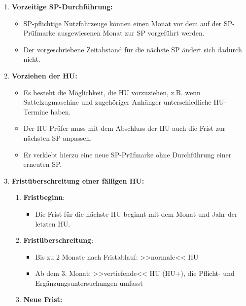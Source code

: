 \documentclass{vorlage-design-main}
\begin{document}
\begin{enumerate}
\def\labelenumi{\arabic{enumi}.}

\item
  \textbf{Vorzeitige SP-Durchführung:}

  \begin{itemize}

  \item
    SP-pflichtige Nutzfahrzeuge können einen Monat vor dem auf der
    SP-Prüfmarke ausgewiesenen Monat zur SP vorgeführt werden.
  \item
    Der vorgeschriebene Zeitabstand für die nächste SP ändert sich
    dadurch nicht.
  \end{itemize}
\item
  \textbf{Vorziehen der HU:}

  \begin{itemize}

  \item
    Es besteht die Möglichkeit, die HU vorzuziehen, z.B. wenn
    Sattelzugmaschine und zugehöriger Anhänger unterschiedliche
    HU-Termine haben.
  \item
    Der HU-Prüfer muss mit dem Abschluss der HU auch die Frist zur
    nächsten SP anpassen.
  \item
    Er verklebt hierzu eine neue SP-Prüfmarke ohne Durchführung einer
    erneuten SP.
  \end{itemize}
\item
  \textbf{Fristüberschreitung einer fälligen HU:}

  \begin{enumerate}
  \def\labelenumii{\arabic{enumii}.}

  \item
    \textbf{Fristbeginn}:

    \begin{itemize}

    \item
      Die Frist für die nächste HU beginnt mit dem Monat und Jahr der
      letzten HU.
    \end{itemize}
  \item
    \textbf{Fristüberschreitung}:

    \begin{itemize}

    \item
      Bis zu 2 Monate nach Fristablauf: >>normale<< HU
    \item
      Ab dem 3. Monat: >>vertiefende<< HU (HU+), die Pflicht- und
      Ergänzungsuntersuchungen umfasst
    \end{itemize}
  \item
    \textbf{Neue Frist:}


\end{enumerate}
\end{enumerate}
\end{document}
